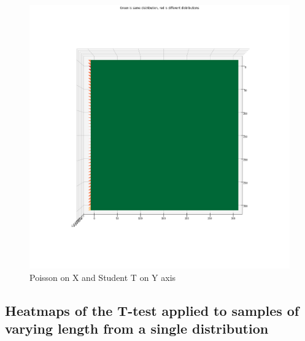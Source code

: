 \clearpage
\begin{figure}[htb]
  \centering
  \includegraphics[width=\linewidth]{./img/hypothesis_test/appendix/naive_X_poisson_Y_student_t.png}
  \caption{Poisson on X and Student T on Y axis}
\end{figure}
\clearpage
\subsection{Heatmaps of the T-test applied to samples of varying length from a single distribution}

